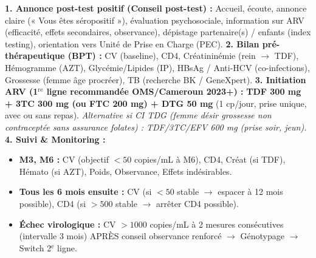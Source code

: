 \documentclass[11pt]{article}
\begin{document}
\begin{experience}
\textbf{1. Annonce post-test positif (Conseil post-test) :} Accueil, écoute, annonce claire (« Vous êtes séropositif »), évaluation psychosociale, information sur ARV (efficacité, effets secondaires, observance), dépistage partenaire(s) / enfants (index testing), orientation vers Unité de Prise en Charge (PEC).
\textbf{2. Bilan pré-thérapeutique (BPT) :} CV (baseline), CD4, Créatininémie (rein $\rightarrow$ TDF), Hémogramme (AZT), Glycémie/Lipides (IP), HBsAg / Anti-HCV (co-infections), Grossesse (femme âge procréer), TB (recherche BK / GeneXpert).
\textbf{3. Initiation ARV (1$^{\text{re}}$ ligne recommandée OMS/Cameroun 2023+) :} \textbf{TDF 300 mg + 3TC 300 mg (ou FTC 200 mg) + DTG 50 mg} (1 cp/jour, prise unique, avec ou sans repas). \emph{Alternative si CI TDG (femme désir grossesse non contraceptée sans assurance folates) : TDF/3TC/EFV 600 mg (prise soir, jeun).}
\textbf{4. Suivi \& Monitoring :}
\begin{itemize}
    \item \textbf{M3, M6 :} CV (objectif $< 50$ copies/mL à M6), CD4, Créat (si TDF), Hémato (si AZT), Poids, Observance, Effets indésirables.
    \item \textbf{Tous les 6 mois ensuite :} CV (si $< 50$ stable $\rightarrow$ espacer à 12 mois possible), CD4 (si $> 500$ stable $\rightarrow$ arrêter CD4 possible).
    \item \textbf{Échec virologique :} CV $> 1000$ copies/mL à 2 mesures consécutives (intervalle 3 mois) APRÈS conseil observance renforcé $\rightarrow$ Génotypage $\rightarrow$ Switch 2$^{\text{e}}$ ligne.
\end{itemize}
\end{experience}
\end{document}
